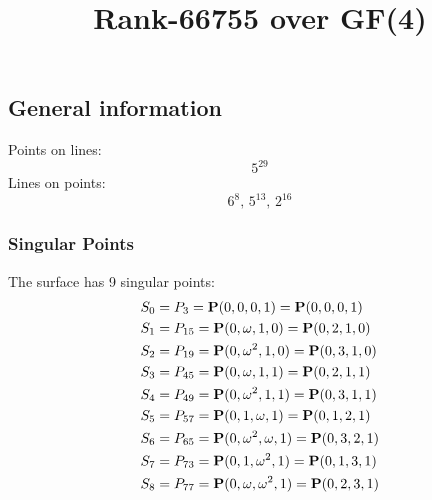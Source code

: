 \documentclass{article}
\newcommand\setTBstruts{\def\T{\rule{0pt}{2.6ex}}%
\def\B{\rule[-1.2ex]{0pt}{0pt}}}
\newcommand{\bP}{{\bf P}}
\begin{document}
 
\setTBstruts



{\allowdisplaybreaks%






\title{Rank-66755 over GF(4)}
\author{}%
\maketitle%
%
{}



\subsection*{General information}
Points on lines:
$$
5^{29}$$
Lines on points:
$$
6^8,\,5^{13},\,2^{16}$$
\subsubsection*{Singular Points}
The surface has 9 singular points:\\
\begin{align*}
S_{0} &= P_{3}=\bP(0, 0, 0, 1) = \bP(0, 0, 0, 1)\\
S_{1} &= P_{15}=\bP(0, \omega , 1, 0) = \bP(0, 2, 1, 0)\\
S_{2} &= P_{19}=\bP(0, \omega^{2}, 1, 0) = \bP(0, 3, 1, 0)\\
S_{3} &= P_{45}=\bP(0, \omega , 1, 1) = \bP(0, 2, 1, 1)\\
S_{4} &= P_{49}=\bP(0, \omega^{2}, 1, 1) = \bP(0, 3, 1, 1)\\
S_{5} &= P_{57}=\bP(0, 1, \omega , 1) = \bP(0, 1, 2, 1)\\
S_{6} &= P_{65}=\bP(0, \omega^{2}, \omega , 1) = \bP(0, 3, 2, 1)\\
S_{7} &= P_{73}=\bP(0, 1, \omega^{2}, 1) = \bP(0, 1, 3, 1)\\
S_{8} &= P_{77}=\bP(0, \omega , \omega^{2}, 1) = \bP(0, 2, 3, 1)\\
\end{align*}
}
\end{document}
